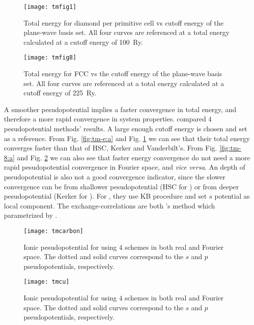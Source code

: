 \begin{figure}[H]
	\centering
	\begin{minipage}[t]{.46\linewidth}
		\centering
		\texttt{[image: tmfig1]}
		\caption{Total energy for diamond per primitive cell vs cutoff energy
			of the plane-wave basis set. All four curves are referenced at a total
			energy calculated at a cutoff energy of \SI{100}{Ry}.
			\cite{Troullier:1991ey}}
		\label{fig:tm-e:a}
	\end{minipage}%
	\hfil
	\begin{minipage}[t]{.46\linewidth}
		\centering
		\texttt{[image: tmfig8]}
		\caption{Total energy for FCC  vs the cutoff energy
			of the plane-wave basis set. All four curves are referenced at a total
			energy calculated at a cutoff energy of \SI{225}{Ry}.
			\cite{Troullier:1991ey}}
		\label{fig:tm-e:b}
	\end{minipage}
\end{figure}
A smoother pesudopotential implies a faster convergence in
total energy, and therefore a more rapid convergence in system properties.
\citeauthor{Troullier:1991ey} compared $4$ pesudopotential methods'
results. A large enough cutoff energy is chosen and set as a reference.
From Fig. \ref{fig:tm-e:a} and Fig. \ref{fig:tm-e:b} we can see that their
total energy converges faster than that of HSC, Kerker and Vanderbilt's.
From Fig. \ref{fig:tm-8:a} and Fig. \ref{fig:tm-8:b} we can also see that
faster energy convergence do not need a more rapid pesudopotential
convergence in Fourier space, and \emph{vice versa}.
An depth of pseudopotential is also not a good convergence indicator,
since the slower convergence can be from shallower pesudopotential (HSC for )
or from deeper pesudopotential (Kerker for ).
For , they use KB procedure and set $s$ potential as local component.
The exchange-correlations are both \citeauthor{ceperley1980ground}'s method which parametrized by \citeauthor{perdew1981self}.
\begin{figure}[H]
	\centering
	\begin{minipage}[b]{.7\linewidth}
		\centering
		\texttt{[image: tmcarbon]}
		\caption{Ionic pesudopotential for  using $4$ schemes in both real and Fourier space.
			The dotted and solid curves correspond to the $s$ and $p$ pseudopotentials, respectively.
			\cite{Troullier:1991ey}}
		\label{fig:tm-8:a}
	\end{minipage}%
	\vspace{\baselineskip}
	\begin{minipage}[b]{.7\linewidth}
		\centering
		\texttt{[image: tmcu]}
		\caption{Ionic pesudopotential for  using $4$ schemes in both real and Fourier space.
			The dotted and solid curves correspond to the $s$ and $p$ pseudopotentials, respectively.
			\cite{Troullier:1991ey}}
		\label{fig:tm-8:b}
	\end{minipage}
\end{figure}

